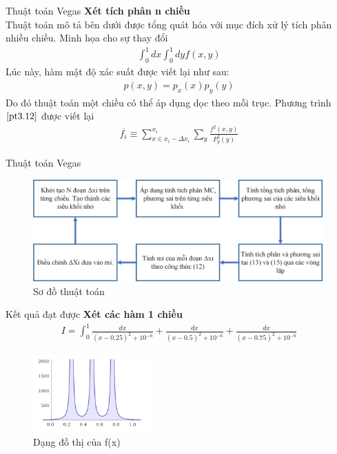 \documentclass{beamer}
\begin{document}
\begin{frame}{Thuật toán Vegas}\vspace{4pt}
  \textbf{Xét tích phân n chiều}\\
  \vspace{0.4em}
  Thuật toán mô tả bên dưới được tổng quát hóa với mục đích xử lý tích phân nhiều chiều. Minh họa cho sự thay đổi 
\begin{align}
      \int_{0}^{1}{dx} \int_{0}^{1}{dyf(x,y)} 
\end{align}
Lúc này, hàm mật độ xác suất được viết lại như sau: 
\begin{align}
      p(x,y)=p_x(x)p_y(y)
\end{align}
Do đó thuật toán một chiều có thể áp dụng dọc theo mỗi trục. Phương trình $ \ref{pt3.12} $ được viết lại
\begin{align}
      \overline{f_i} \equiv {\sum_{x\in{x_i-\Delta}x_i}^{x_i}}{\sum_y{\frac{f^2(x,y)}{P_y^2(y)}}}
\end{align}
\end{frame}


\begin{frame}{Thuật toán Vegas}\vspace{4pt}
  \begin{figure}[H]
    \centering
    \includegraphics[width=1\textwidth]{flowchar.png}
    \caption{Sơ đồ thuật toán}\label{hinh3.2}
\end{figure}
\end{frame}


\begin{frame}{Kết quả đạt được}\vspace{4pt}
  \textbf{Xét các hàm 1 chiều}\\
  \vspace{0.4em}
\begin{align}
        I=\int_{0}^{1}\frac{dx}{(x-0.25)^2 +10^{-6}}+\frac{dx}{(x-0.5)^2 +10^{-6}}+\frac{dx}{(x-0.75)^2 +10^{-6}}
    \end{align}
    \begin{figure}[H]
        \centering
        \includegraphics[width=0.4\textwidth]{1d_x02505075.png}
        \caption{Dạng đồ thị của f(x)}\label{hinh3.2}
    \end{figure}
\end{frame}
\end{document}
